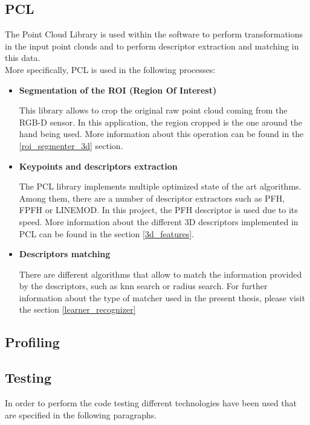 	\subsection{PCL}
		The Point Cloud Library is used within the software to perform transformations in the input point clouds and to perform descriptor extraction and matching in this data. 
		\\

		More specifically, PCL is used in the following processes: 

		\begin{itemize}
			\item{\textbf{Segmentation of the ROI (Region Of Interest)\\ }}

			This library allows to crop the original raw point cloud coming from the RGB-D sensor. In this application, the region cropped is the one around the hand being used. More information about this operation can be found in the \ref{roi_segmenter_3d} section. 
			

			\item{\textbf{ Keypoints and descriptors extraction\\ }}

			 The PCL library implements multiple optimized state of the art algorithms. Among them, there are a number of descriptor extractors such as PFH, FPFH or LINEMOD. In this project, the PFH descriptor is used due to its speed. More information about the different 3D descriptors implemented in PCL can be found in the section \ref{3d_features}.


			\item {\textbf{Descriptors matching\\ }}

			There are different algorithms that allow to match the information provided by the descriptors, such as knn search or radius search. For further information about the type of matcher used in the present thesis, please visit the section \ref{learner_recognizer}
		\end{itemize}

	\subsection{Profiling}


	\subsection{Testing}
	\label{testing}
		In order to perform the code testing different technologies have been used that are specified in the following paragraphs. 
		\\


